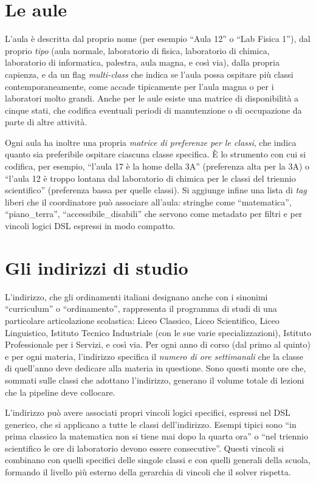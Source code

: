 \section{Le aule}

L'aula \`e descritta dal proprio nome (per esempio ``Aula
12'' o ``Lab Fisica 1''), dal proprio \emph{tipo} (aula
normale, laboratorio di fisica, laboratorio di chimica,
laboratorio di informatica, palestra, aula magna, e cos\`i
via), dalla propria capienza, e da un flag \emph{multi-class}
che indica se l'aula possa ospitare pi\`u classi
contemporaneamente, come accade tipicamente per l'aula magna
o per i laboratori molto grandi. Anche per le aule esiste
una matrice di disponibilit\`a a cinque stati, che codifica
eventuali periodi di manutenzione o di occupazione da parte
di altre attivit\`a.

Ogni aula ha inoltre una propria \emph{matrice di
preferenze per le classi}, che indica quanto sia preferibile
ospitare ciascuna classe specifica. \`E lo strumento con cui
si codifica, per esempio, ``l'aula 17 \`e la home della 3A''
(preferenza alta per la 3A) o ``l'aula 12 \`e troppo lontana
dal laboratorio di chimica per le classi del triennio
scientifico'' (preferenza bassa per quelle classi). Si
aggiunge infine una lista di \emph{tag} liberi che il
coordinatore pu\`o associare all'aula: stringhe come
``matematica'', ``piano\_terra'', ``accessibile\_disabili''
che servono come metadato per filtri e per vincoli logici
DSL espressi in modo compatto.

\section{Gli indirizzi di studio}

L'indirizzo, che gli ordinamenti italiani designano anche
con i sinonimi ``curriculum'' o ``ordinamento'', rappresenta
il programma di studi di una particolare articolazione
scolastica: Liceo Classico, Liceo Scientifico, Liceo
Linguistico, Istituto Tecnico Industriale (con le sue varie
specializzazioni), Istituto Professionale per i Servizi, e
cos\`i via. Per ogni anno di corso (dal primo al quinto) e
per ogni materia, l'indirizzo specifica il \emph{numero di
ore settimanali} che la classe di quell'anno deve dedicare
alla materia in questione. Sono questi monte ore che, sommati
sulle classi che adottano l'indirizzo, generano il volume
totale di lezioni che la pipeline deve collocare.

L'indirizzo pu\`o avere associati propri vincoli logici
specifici, espressi nel DSL generico, che si applicano a
tutte le classi dell'indirizzo. Esempi tipici sono ``in
prima classico la matematica non si tiene mai dopo la quarta
ora'' o ``nel triennio scientifico le ore di laboratorio
devono essere consecutive''. Questi vincoli si combinano con
quelli specifici delle singole classi e con quelli generali
della scuola, formando il livello pi\`u esterno della
gerarchia di vincoli che il solver rispetta.

